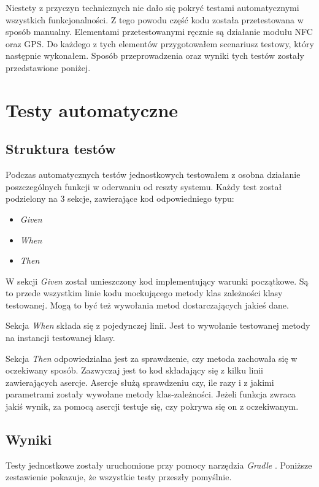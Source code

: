 \documentclass[openright]{xmgr}
\begin{document}
Niestety z przyczyn technicznych nie dało się pokryć testami automatycznymi wszystkich funkcjonalności. Z tego powodu część kodu została przetestowana w sposób manualny. Elementami przetestowanymi ręcznie są działanie modułu NFC oraz GPS. Do każdego z tych elementów przygotowałem scenariusz testowy, który następnie wykonałem. Sposób przeprowadzenia oraz wyniki tych testów zostały przedstawione poniżej.

\section{Testy automatyczne}
\subsection{Struktura testów}
Podczas  automatycznych testów jednostkowych testowałem z osobna działanie poszczególnych funkcji w oderwaniu od reszty systemu. Każdy test został podzielony na 3 sekcje, zawierające kod odpowiedniego typu:
\begin{itemize}
\item \textit{Given}
\item \textit{When}
\item \textit{Then}
\end{itemize}

W sekcji \textit{Given} został umieszczony kod implementujący warunki początkowe. Są to przede wszystkim linie kodu mockującego metody klas zależności klasy testowanej. Mogą to być też wywołania metod dostarczających jakieś dane. 

Sekcja \textit{When} składa się z pojedynczej linii. Jest to wywołanie testowanej metody na instancji testowanej klasy.

Sekcja \textit{Then} odpowiedzialna jest za sprawdzenie, czy metoda zachowała się w oczekiwany sposób. Zazwyczaj jest to kod składający się z kilku linii zawierających asercje. Asercje służą sprawdzeniu czy, ile razy i z jakimi parametrami zostały wywołane metody klas-zależności. Jeżeli funkcja zwraca jakiś wynik, za pomocą asercji testuje się, czy pokrywa się on z oczekiwanym.

\subsection{Wyniki}
Testy jednostkowe zostały uruchomione przy pomocy narzędzia \textit{Gradle} \cite{Gradle:2017:Doc}. Poniższe zestawienie pokazuje, że wszystkie testy przeszły pomyślnie.
\end{document}
